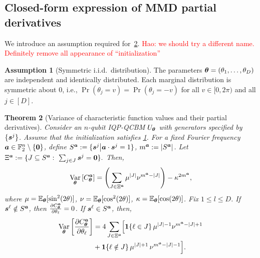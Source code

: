 \documentclass{article}
\theoremstyle{plain}
\newtheorem{theorem}{Theorem}[section]
\theoremstyle{definition}
\newtheorem{assumption}[theorem]{Assumption}
\theoremstyle{remark}
\newcommand{\hw}[1]{\textcolor{red}{Hao: #1}}
\begin{document}
\subsection{Closed-form expression of MMD partial derivatives}
\label{subsec:mmd}
We introduce an assumption required for~\cref{thm: single symmetric}.
\hw{we should try a different name. Definitely remove all appearance of ``initialization''}
\begin{assumption}[Symmetric i.i.d.\ distribution]
\label{ass:symm-iid-init}
The parameters ${\bm{\theta}}=(\theta_1,\dots,\theta_D)$ are independent and identically distributed. Each marginal distribution is symmetric about $0$, i.e., $\Pr(\theta_j = v) = \Pr(\theta_j = -v)$ for all $v\in[0, 2\pi)$ and all $j\in[D]$.
\end{assumption}
\label{subsec:general MMD results}
\begin{theorem}[Variance of characteristic function values and their partial derivatives]
\label{thm: single symmetric}
Consider an $n$-qubit IQP-QCBM $U_{\bm{\theta}}$ with generators specified by $\{{\bm{s}^j}\}$. Assume that the initialization satisfies \cref{ass:symm-iid-init}. For a fixed Fourier frequency ${\bm{a}} \in \mathbb{F}_2^n \setminus \{\mathbf{0}\}$, define $S^{{\bm{a}}} := \{ {\bm{s}^j} \big| {\bm{a}} \cdot {\bm{s}^j} = 1 \}$, $
m^{\bm{a}} := \abs{S^{{\bm{a}}}}$. Let $
\Xi^\vta:= \{J\subseteq S^\vta:\ \sum_{j\in J}\vtsj=\mathbf 0 \}.$ Then, 
\begin{equation}
     \operatorname*{Var}_{\bm{\theta}} \left[ C^{\bm{a}}_{\bm{\theta}} \right] = 
\left(\sum_{J\in \Xi^{\bm{a}}} \mu^{|J|} \nu^{m^{\bm{a}}-|J|}\right) - \kappa^{2m^{\bm{a}}},
\end{equation}
where $\mu=\operatorname*{\mathbb{E}}_{{\bm{\theta}}}[\sin^2(2\theta)]$, $\nu=\operatorname*{\mathbb{E}}_{{\bm{\theta}}}[\cos^2(2\theta)]$, $\kappa=\operatorname*{\mathbb{E}}_{{\bm{\theta}}}[\cos(2\theta)]$. Fix $1\leq l \leq D$. If ${\bm{s}^\ell} \notin S^{\bm{a}}$, then $ \frac{\partial C^{\bm{a}}_{\bm{\theta}}}{\partial \theta_\ell}=0$. If ${\bm{s}^\ell} \in S^{\bm{a}}$, then, 
\begin{align}
\operatorname*{Var}_{\bm{\theta}} \left[ \frac{\partial C^{\bm{a}}_{\bm{\theta}}}{\partial \theta_\ell} \right]
&= 4\sum_{J\in \Xi^{\bm{a}}}
\Bigl[
\bm{1}\{\ell\in J\}\,\mu^{|J|-1}\nu^{m^{\bm{a}}-|J|+1} \notag
\\&+
\bm{1}\{\ell\notin J\}\,\mu^{|J|+1}\,\nu^{m^{\bm{a}}-|J|-1}\Bigr].
\label{eq: symmetric variance}
\end{align}
\end{theorem}
\end{document}
